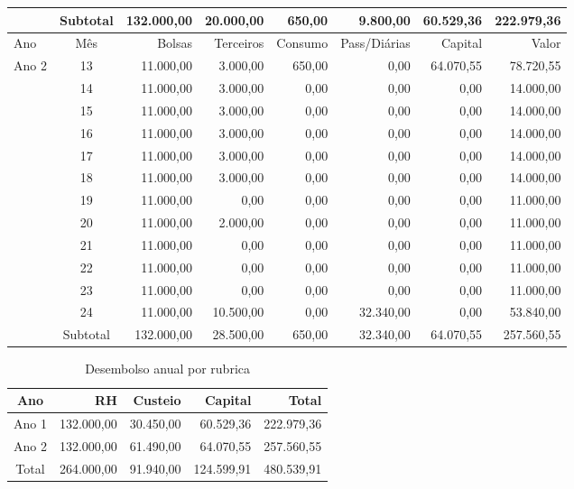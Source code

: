 \begin{table}[!h]
\begin{tabular}{lcrrrrrr}
\midrule
	     & Subtotal & 132.000,00 & 20.000,00 & 650,00  & 9.800,00     & 60.529,36 & 222.979,36\\
\midrule
\midrule
   \rowcolor{lgray}
	Ano  & Mês      & Bolsas  & Terceiros  & Consumo & Pass/Diárias & Capital    & Valor \\
\midrule
       Ano 2 & 13       &  11.000,00 &  3.000,00 & 650,00  &      0,00   & 64.070,55 &  78.720,55\\
             & 14       &  11.000,00 &  3.000,00 &   0,00  &      0,00   &      0,00 &  14.000,00\\
             & 15       &  11.000,00 &  3.000,00 &   0,00  &      0,00   &      0,00 &  14.000,00\\
             & 16       &  11.000,00 &  3.000,00 &   0,00  &      0,00   &      0,00 &  14.000,00\\
             & 17       &  11.000,00 &  3.000,00 &   0,00  &      0,00   &      0,00 &  14.000,00\\
             & 18       &  11.000,00 &  3.000,00 &   0,00  &      0,00   &      0,00 &  14.000,00\\
             & 19       &  11.000,00 &      0,00 &   0,00  &      0,00   &      0,00 &   11.000,00\\
             & 20       &  11.000,00 &  2.000,00 &   0,00  &      0,00   &      0,00 &   11.000,00\\
             & 21       &  11.000,00 &      0,00 &   0,00  &      0,00   &      0,00 &   11.000,00\\
             & 22       &  11.000,00 &      0,00 &   0,00  &      0,00   &      0,00 &   11.000,00\\
             & 23       &  11.000,00 &      0,00 &   0,00  &      0,00   &      0,00 &   11.000,00\\
             & 24       &  11.000,00 & 10.500,00 &   0,00  & 32.340,00   &      0,00 &  53.840,00\\
\midrule
	     & Subtotal & 132.000,00 & 28.500,00 & 650,00  & 32.340,00   & 64.070,55 & 257.560,55\\
\bottomrule
\end{tabular}
	\label{tab:geral-mes-tipo}
\end{table}

\begin{table}[!h]
	\caption{Desembolso anual por rubrica}
\centering
\begin{tabular}{crrrr}
\toprule
	Ano   & RH         & Custeio   & Capital    & Total \\
\midrule
	Ano 1 & 132.000,00  & 30.450,00 & 60.529,36  & 222.979,36\\
	Ano 2 & 132.000,00  & 61.490,00 & 64.070,55  & 257.560,55\\
\midrule
	Total & 264.000,00 & 91.940,00 & 124.599,91 & 480.539,91\\
\bottomrule
\end{tabular}
	\label{tab:geral-ano-rubrica}
\end{table}
\clearpage
%

